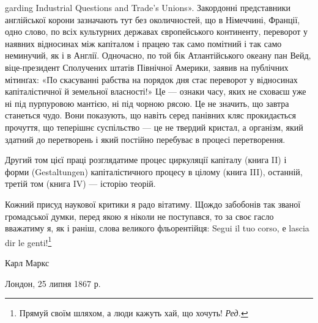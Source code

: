 garding Industrial Questions and Trade’s Unions». Закордонні
представники англійської корони зазначають тут без околичностей,
що в Німеччині, Франції, одно слово, по всіх культурних
державах європейського континенту, переворот у наявних відносинах
між капіталом і працею так само помітний і так само неминучий,
як і в Англії. Одночасно, по той бік Атлантійського океану
пан Вейд, віце-президент Сполучених штатів Північної Америки,
заявив на публічних мітинґах: «По скасуванні рабства
на порядок дня стає переворот у відносинах капіталістичної й
земельної власності!» Це — ознаки часу, яких не сховаєш уже
ні під пурпуровою мантією, ні під чорною рясою. Це не значить,
що завтра станеться чудо. Вони показують, що навіть серед панівних
кляс прокидається прочуття, що теперішнє суспільство —
це не твердий кристал, а організм, який здатний до перетворень
і який постійно перебуває в процесі перетворення.

Другий том цієї праці розглядатиме процес циркуляції капіталу
(книга II) і форми (Gestaltungen) капіталістичного процесу
в цілому (книга III), останній, третій том (книга IV) — історію
теорій.

Кожний присуд наукової критики я радо вітатиму. Щождо
забобонів так званої громадської думки, перед якою я ніколи не
поступався, то за своє гасло вважатиму я, як і раніш, слова великого
фльорентійця: Segui il tuo corso, е lascia dir le genti!\footnote*{
Прямуй своїм шляхом, а люди кажуть хай, що хочуть! \emph{Ред.}
}

Карл Маркс

Лондон, 25 липня 1867 р.
